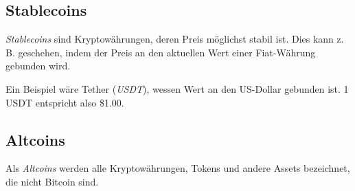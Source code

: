\subsection{Stablecoins}
\textit{Stablecoins} sind Kryptowährungen, deren Preis möglichst stabil ist. Dies kann z. B. geschehen, indem der Preis an den aktuellen Wert einer Fiat-Währung gebunden wird.

Ein Beispiel wäre Tether (\textit{USDT}), wessen Wert an den US-Dollar gebunden ist. 1 USDT entspricht also \$1.00.

\subsection{Altcoins}
Als \textit{Altcoins} werden alle Kryptowährungen, Tokens und andere Assets bezeichnet, die nicht Bitcoin sind.